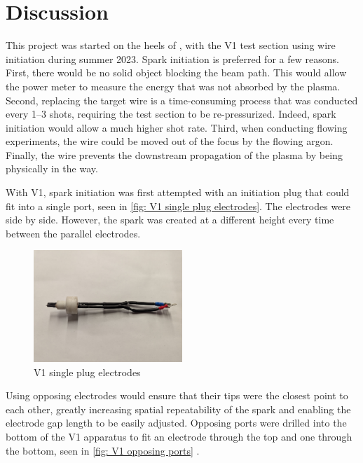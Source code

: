\chapter{Discussion}


This project was started on the heels of \textcite{duplayArgonLaserPlasmaThruster2024a}, with the V1 test section using wire initiation during summer 2023. Spark initiation is preferred for a few reasons. First, there would be no solid object blocking the beam path. This would allow the power meter to measure the energy that was not absorbed by the plasma. Second, replacing the target wire is a time-consuming process that was conducted every 1–3 shots, requiring the test section to be re-pressurized. Indeed, spark initiation would allow a much higher shot rate. Third, when conducting flowing experiments, the wire could be moved out of the focus by the flowing argon. Finally, the wire prevents the downstream propagation of the plasma by being physically in the way.

With V1, spark initiation was first attempted with an initiation plug that could fit into a single port, seen in \autoref{fig: V1 single plug electrodes}. The electrodes were side by side. However, the spark was created at a different height every time between the parallel electrodes.

\begin{figure}[!ht]
    \centering
    \includegraphics[width=0.5\textwidth]{assets/5 discussion/V1 single plug electrode.jpg}
    \caption{V1 single plug electrodes}
    \label{fig: V1 single plug electrodes}
\end{figure}

Using opposing electrodes would ensure that their tips were the closest point to each other, greatly increasing spatial repeatability of the spark and enabling the electrode gap length to be easily adjusted. Opposing ports were drilled into the bottom of the V1 apparatus to fit an electrode through the top and one through the bottom, seen in \autoref{fig: V1 opposing ports} .

